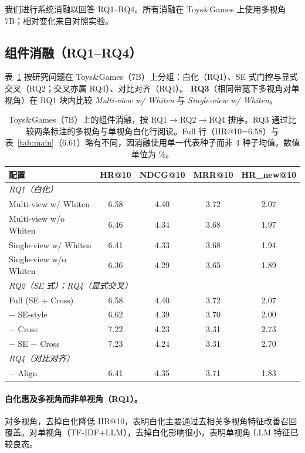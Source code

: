 \documentclass[sigconf,natbib=true,anonymous]{acmart}
\begin{document}
我们进行系统消融以回答 RQ1--RQ4。所有消融在 Toys\&Games 上使用多视角 7B；相对变化来自对照实验。
\subsection{组件消融（RQ1--RQ4）}

表~\ref{tab:ablation} 按研究问题在 Toys\&Games（7B）上分组：白化（RQ1）、SE 式门控与显式交叉（RQ2；交叉亦属 RQ4）、对比对齐（RQ4）。
\textbf{RQ3}（相同带宽下多视角对单视角）在 RQ1 块内比较 \emph{Multi-view w/ Whiten} 与 \emph{Single-view w/ Whiten}。

\begin{table}[t]
\caption{Toys\&Games（7B）上的组件消融，按 RQ1$\rightarrow$RQ2$\rightarrow$RQ4 排序。RQ3 通过比较两条标注的多视角与单视角白化行阅读。Full 行（HR@10=6.58）与表~\ref{tab:main}（6.61）略有不同，因消融使用单一代表种子而非 4 种子均值。数值单位为 \%。}
\label{tab:ablation}
\centering
\scriptsize
\begin{tabular}{@{}lcccc@{}}
\toprule
\textbf{配置} & HR@10 & NDCG@10 & MRR@10 & HR\_new@10 \\
\midrule
\multicolumn{5}{l}{\textit{RQ1（白化）}} \\
Multi-view w/ Whiten & 6.58 & 4.40 & 3.72 & 2.07 \\
Multi-view w/o Whiten & 6.46 & 4.34 & 3.68 & 1.97 \\
Single-view w/ Whiten & 6.41 & 4.33 & 3.68 & 1.94 \\
Single-view w/o Whiten & 6.36 & 4.29 & 3.65 & 1.89 \\
\midrule
\multicolumn{5}{l}{\textit{RQ2（SE 式）；RQ4（显式交叉）}} \\
Full (SE + Cross) & 6.58 & 4.40 & 3.72 & 2.07 \\
$-$ SE-style & 6.62 & 4.39 & 3.70 & 2.00 \\
$-$ Cross & 7.22 & 4.23 & 3.31 & 2.73 \\
$-$ SE $-$ Cross & 7.23 & 4.24 & 3.31 & 2.70 \\
\midrule
\multicolumn{5}{l}{\textit{RQ4（对比对齐）}} \\
$-$ Align & 6.41 & 4.35 & 3.71 & 1.83 \\
\bottomrule
\end{tabular}
\end{table}

\paragraph{白化惠及多视角而非单视角（RQ1）。}
对多视角，去掉白化降低 HR@10，表明白化主要通过去相关多视角特征改善召回覆盖。对单视角（TF-IDF+LLM），去掉白化影响很小，表明单视角 LLM 特征已较良态。
\end{document}
